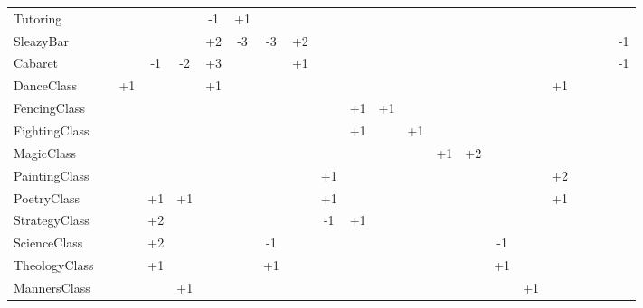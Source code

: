 \documentclass[12pt, a4paper]{report}
\begin{document}
\begin{table}
\begin{tabular}{l*{21}{c}}
			Tutoring       &     &     &     &     & -1  & +1  &     &     &     &     &     &     &     &     &     &     &     &     &     &     &     \\
			SleazyBar      &     &     &     &     & +2  & -3  & -3  & +2  &     &     &     &     &     &     &     &     &     &     &     &     & -1  \\
			Cabaret        &     &     & -1  & -2  & +3  &     &     & +1  &     &     &     &     &     &     &     &     &     &     &     &     & -1  \\
			DanceClass     &     & +1  &     &     & +1  &     &     &     &     &     &     &     &     &     &     &     & +1  &     &     &     &     \\
			FencingClass   &     &     &     &     &     &     &     &     &     & +1  & +1  &     &     &     &     &     &     &     &     &     &     \\
			FightingClass  &     &     &     &     &     &     &     &     &     & +1  &     & +1  &     &     &     &     &     &     &     &     &     \\
			MagicClass     &     &     &     &     &     &     &     &     &     &     &     &     & +1  & +2  &     &     &     &     &     &     &     \\
			PaintingClass  &     &     &     &     &     &     &     &     & +1  &     &     &     &     &     &     &     & +2  &     &     &     &     \\
			PoetryClass    &     &     & +1  & +1  &     &     &     &     & +1  &     &     &     &     &     &     &     & +1  &     &     &     &     \\
			StrategyClass  &     &     & +2  &     &     &     &     &     & -1  & +1  &     &     &     &     &     &     &     &     &     &     &     \\
			ScienceClass   &     &     & +2  &     &     &     & -1  &     &     &     &     &     &     &     & -1  &     &     &     &     &     &     \\
			TheologyClass  &     &     & +1  &     &     &     & +1  &     &     &     &     &     &     &     & +1  &     &     &     &     &     &     \\
			MannersClass   &     &     &     & +1  &     &     &     &     &     &     &     &     &     &     &     & +1  &     &     &     &     &     \\
			\bottomrule
		\end{tabular}
	\end{table}
	
\end{document}
